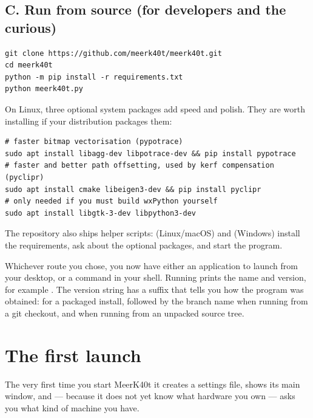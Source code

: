 \subsection*{C. Run from source (for developers and the curious)}

\begin{lstlisting}[style=konsole]
git clone https://github.com/meerk40t/meerk40t.git
cd meerk40t
python -m pip install -r requirements.txt
python meerk40t.py
\end{lstlisting}

\noindent On Linux, three optional system packages add speed and polish. They are
worth installing if your distribution packages them:

\begin{lstlisting}[style=konsole]
# faster bitmap vectorisation (pypotrace)
sudo apt install libagg-dev libpotrace-dev && pip install pypotrace
# faster and better path offsetting, used by kerf compensation (pyclipr)
sudo apt install cmake libeigen3-dev && pip install pyclipr
# only needed if you must build wxPython yourself
sudo apt install libgtk-3-dev libpython3-dev
\end{lstlisting}

\noindent The repository also ships helper scripts: 
(Linux/macOS) and  (Windows) install the requirements, ask
about the optional packages, and start the program.

\begin{notebox}
Whichever route you chose, you now have either an application to launch from your
desktop, or a  command in your shell. Running
 prints the name and version, for example
. The version string has a suffix that tells you how the
program was obtained:  for a packaged install,  followed by
the branch name when running from a git checkout, and  when running
from an unpacked source tree.
\end{notebox}

\section{The first launch}

The very first time you start MeerK40t it creates a settings file, shows its main
window, and --- because it does not yet know what hardware you own --- asks you
what kind of machine you have.

